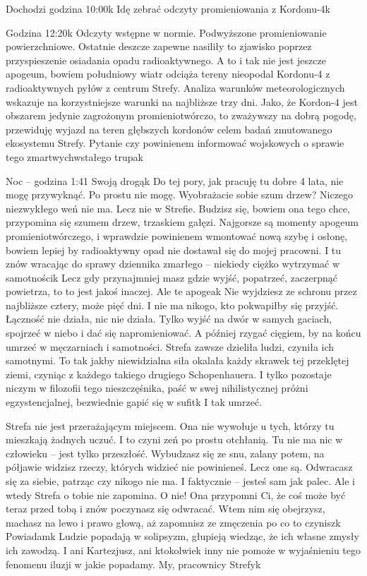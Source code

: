 \documentclass[../MAIN.tex]{subfiles}
\begin{document}
Dochodzi godzina 10:00\3k
Idę zebrać odczyty promieniowania z Kordonu-4\3k

Godzina 12:20\3k
Odczyty wstępne w normie. Podwyższone promieniowanie
powierzchniowe. Ostatnie deszcze zapewne nasiliły to zjawisko
poprzez przyspieszenie osiadania opadu radioaktywnego. A to i
tak nie jest jeszcze apogeum, bowiem południowy wiatr odciąża
tereny nieopodal Kordonu-4 z radioaktywnych pyłów z centrum
Strefy. Analiza warunków meteorologicznych wskazuje na
korzystniejsze warunki na najbliższe trzy dni. Jako, że
Kordon-4 jest obszarem jedynie zagrożonym promieniotwórczo, to
zważywszy na dobrą pogodę, przewiduję wyjazd na teren głębszych
kordonów celem badań zmutowanego ekosystemu Strefy. Pytanie czy
powinienem informować wojskowych o sprawie tego
zmartwychwstałego trupa\3k

Noc – godzina 1:41
Swoją drogą\3k Do tej pory, jak pracuję tu dobre 4 lata, nie
mogę przywyknąć. Po prostu nie mogę. Wyobrażacie sobie szum
drzew? Niczego niezwykłego weń nie ma. Lecz nie w Strefie.
Budzisz się, bowiem ona tego chce, przypomina się szumem drzew,
trzaskiem gałęzi. Najgorsze są momenty apogeum
promieniotwórczego, i wprawdzie powinienem wmontować nową szybę
i osłonę, bowiem lepiej by radioaktywny opad nie dostawał się
do mojej pracowni. I tu znów wracając do sprawy dziennika
zmarłego – niekiedy ciężko wytrzymać w samotności\3k Lecz gdy
przynajmniej masz gdzie wyjść, popatrzeć, zaczerpnąć powietrza,
to to jest jakoś inaczej. Ale te apogea\3k Nie wyjdziesz ze
schronu przez najbliższe cztery, może pięć dni. I nie ma
nikogo, kto pokwapiłby się przyjść. Łączność nie działa, nic
nie działa. Tylko wyjść na dwór w samych gaciach, spojrzeć w
niebo i dać się napromieniować. A później rzygać cięgiem, by na
końcu umrzeć w męczarniach i samotności. Strefa zawsze dzieliła
ludzi, czyniła ich samotnymi. To tak jakby niewidzialna siła
okalała każdy skrawek tej przeklętej ziemi, czyniąc z każdego
takiego drugiego Schopenhauera. I tylko pozostaje niczym w
filozofii tego nieszczęśnika, paść w swej nihilistycznej próżni
egzystencjalnej, bezwiednie gapić się w sufit\3k I tak umrzeć.

Strefa nie jest przerażającym miejscem. Ona nie wywołuje u
tych, którzy tu mieszkają żadnych uczuć. I to czyni zeń po
prostu otchłanią. Tu nie ma nic w człowieku – jest tylko
przeszłość. Wybudzasz się ze snu, zalany potem, na półjawie
widzisz rzeczy, których widzieć nie powinieneś. Lecz one są.
Odwracasz się za siebie, patrząc czy nikogo nie ma. I
faktycznie – jesteś sam jak palec. Ale i wtedy Strefa o tobie
nie zapomina. O nie! Ona przypomni Ci, że coś może być teraz
przed tobą i znów poczynasz się odwracać. Wtem nim się
obejrzysz, machasz na lewo i prawo głową, aż zapomnisz ze
zmęczenia po co to czynisz\3k Powiadam\3k Ludzie popadają w
solipsyzm, głupieją wiedząc, że ich własne zmysły ich zawodzą.
I ani Kartezjusz, ani ktokolwiek inny nie pomoże w wyjaśnieniu
tego fenomenu iluzji w jakie popadamy. My, pracownicy Strefy\3k
\end{document}
